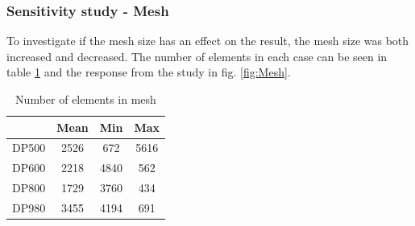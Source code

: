 \documentclass{article}
\begin{document}
\subsubsection{Sensitivity study - Mesh}
\label{SensStudyMesh}
To investigate if the mesh size has an effect on the result, the mesh size was both increased and decreased. The number of elements in each case can be seen in table \ref{tab:NumberElem} and the response from the study in fig. \ref{fig:Mesh}.



\begin{center}
\begin{table}[h!]
    \centering
    \begin{tabular}{c|ccc}

        \hline
         & Mean & Min & Max  \\ [0.5ex]
         \hline
         \rowcolor{Gray}
         DP500 & 2526 & 672 & 5616 \\
         
         DP600 &2218 & 4840 & 562 \\
         \rowcolor{Gray}
         DP800 &1729 & 3760 &434  \\
       
         DP980 &3455 &4194 &691 \\
         \hline

    \end{tabular}
    \caption{Number of elements in mesh}
    \label{tab:NumberElem}
\end{table}
\end{center}
\end{document}
